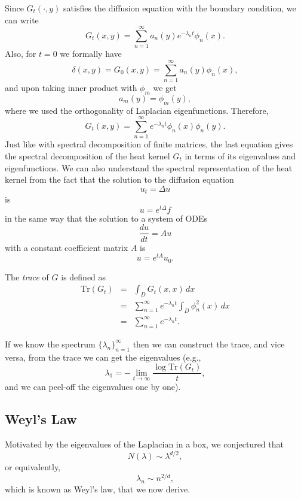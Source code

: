 Since $G_t(\cdot,y)$ satisfies the diffusion equation with the boundary condition, we can write $$G_t(x,y) = \sum_{n=1}^\infty a_n(y) e^{-\lambda_n t} \phi_n(x).$$ Also, for $t=0$ we formally have
\begin{equation*}
\delta(x,y) = G_0(x,y) = \sum_{n=1}^\infty a_n(y)\phi_n(x),
\end{equation*}
and upon taking inner product with $\phi_m$ we get
\begin{equation*}
a_m(y) = \phi_m(y),
\end{equation*}
where we used the orthogonality of Laplacian eigenfunctions. Therefore,
$$G_t(x,y) = \sum_{n=1}^\infty e^{-\lambda_n t} \phi_n(x)\phi_n(y).$$
Just like with spectral decomposition of finite matrices, the last equation gives the spectral decomposition of the heat kernel $G_t$ in terms of its eigenvalues and eigenfunctions.
We can also understand the spectral representation of the heat kernel from the fact that the solution to the diffusion equation
$$u_t = \Delta u$$
is
$$u = e^{t \Delta } f$$
in the same way that the solution to a system of ODEs
$$\frac{du}{dt} = Au$$
with a constant coefficient matrix $A$ is
$$u = e^{tA}u_0.$$

The {\em{trace}} of $G$ is defined as
\begin{eqnarray*}
\text{Tr}(G_t) &=& \int_D G_t(x,x)\,dx\\
&=&\sum_{n=1}^\infty e^{-\lambda_n t} \int_D  \phi_n^2(x)\, dx\\
&=&\sum_{n=1}^\infty e^{-\lambda_n t}.
\end{eqnarray*}

If we know the spectrum $\{\lambda_n\}_{n=1}^\infty$ then we can construct the trace, and vice versa, from the trace we can get the eigenvalues (e.g., $$\lambda_1 = -\lim_{t\to \infty} \frac{\log \text{Tr}(G_t)}{t},$$ and we can peel-off the eigenvalues one by one).

\subsection{Weyl's Law}
Motivated by the eigenvalues of the Laplacian in a box, we conjectured that
\begin{equation*}
N(\lambda) \sim \lambda^{d/2},
\end{equation*}
or equivalently,
\begin{equation*}
\lambda_n \sim n^{2/d},
\end{equation*}
which is known as Weyl's law, that we now derive.

